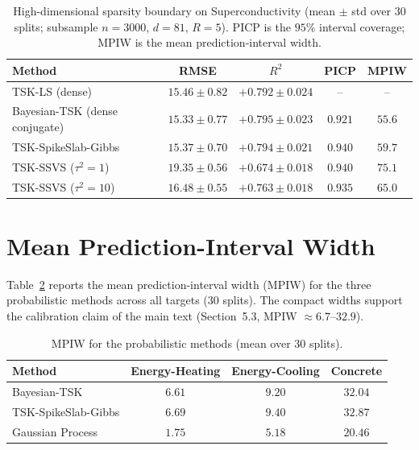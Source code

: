 \documentclass[review,1p,times]{elsarticle}
\begin{document}
\begin{table}[htbp]
\centering
\caption{High-dimensional sparsity boundary on Superconductivity (mean $\pm$ std over $30$ splits; subsample $n=3000$, $d=81$, $R=5$). PICP is the $95\%$ interval coverage; MPIW is the mean prediction-interval width.}
\label{tab:highdim}
\footnotesize
\begin{tabular}{lcccc}
\toprule
Method & RMSE & $R^2$ & PICP & MPIW \\
\midrule
TSK-LS (dense)              & $15.46{\pm}0.82$ & $+0.792{\pm}0.024$ & -- & -- \\
Bayesian-TSK (dense conjugate) & $15.33{\pm}0.77$ & $+0.795{\pm}0.023$ & $0.921$ & $55.6$ \\
TSK-SpikeSlab-Gibbs         & $15.37{\pm}0.70$ & $+0.794{\pm}0.021$ & $0.940$ & $59.7$ \\
TSK-SSVS ($\tau^2=1$)       & $19.35{\pm}0.56$ & $+0.674{\pm}0.018$ & $0.940$ & $75.1$ \\
TSK-SSVS ($\tau^2=10$)      & $16.48{\pm}0.55$ & $+0.763{\pm}0.018$ & $0.935$ & $65.0$ \\
\bottomrule
\end{tabular}
\end{table}

\FloatBarrier

\section{Mean Prediction-Interval Width}

Table~\ref{tab:mpiw} reports the mean prediction-interval width (MPIW) for the three probabilistic methods across all targets (30 splits). The compact widths support the calibration claim of the main text (Section~5.3, MPIW $\approx6.7$--$32.9$).

\begin{table}[htbp]
\centering
\caption{MPIW for the probabilistic methods (mean over 30 splits).}
\label{tab:mpiw}
\footnotesize
\begin{tabular}{lccc}
\toprule
Method & Energy-Heating & Energy-Cooling & Concrete \\
\midrule
Bayesian-TSK        & $6.61$ & $9.20$ & $32.04$ \\
TSK-SpikeSlab-Gibbs & $6.69$ & $9.40$ & $32.87$ \\
Gaussian Process    & $1.75$ & $5.18$ & $20.46$ \\
\bottomrule
\end{tabular}
\end{table}
\end{document}
